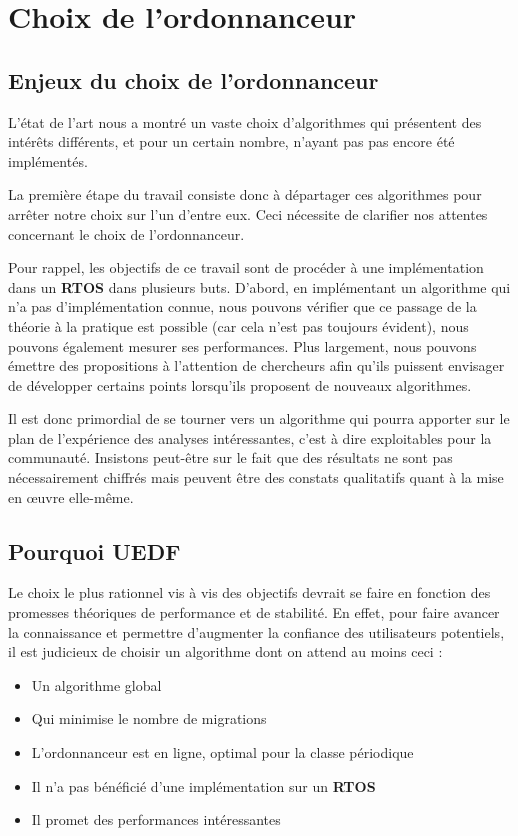 \section{Choix de l'ordonnanceur}

	\subsection{Enjeux du choix de l'ordonnanceur}

	L'état de l'art nous a montré un vaste choix d'algorithmes qui présentent 
	des intérêts différents, et pour un certain nombre, 
	n'ayant pas pas encore été implémentés. \newline
	
	La première étape du travail consiste donc à départager ces algorithmes pour arrêter notre choix sur l'un d'entre eux. Ceci nécessite de clarifier nos attentes concernant le choix de l'ordonnanceur.\newline
	
	Pour rappel, les objectifs de ce travail sont de procéder à une implémentation dans 
	un \textbf{RTOS} dans plusieurs buts. 
	D'abord, en implémentant un algorithme qui n'a pas d'implémentation connue, nous 
	pouvons vérifier que ce passage de la théorie à la pratique est possible (car cela n'est pas 
	toujours évident), nous pouvons également mesurer ses performances. 
	Plus largement, nous pouvons émettre des propositions à l'attention de chercheurs 
	afin qu'ils puissent envisager de développer certains points lorsqu'ils proposent de nouveaux algorithmes. \newline
	
	Il est donc primordial de se tourner vers un algorithme qui pourra apporter sur le plan de 
	l'expérience des analyses intéressantes, c'est à dire exploitables pour la communauté. 
	Insistons peut-être sur le fait que des résultats ne sont pas nécessairement chiffrés mais 
	peuvent être des constats qualitatifs quant à la mise en œuvre elle-même.\newline
	
	\subsection{Pourquoi UEDF}
	
	Le choix le plus rationnel vis à vis des objectifs devrait se faire en fonction des 
	promesses théoriques de performance et de stabilité. 
	En effet, pour faire avancer la connaissance et permettre d'augmenter la confiance des utilisateurs 
	potentiels, il est judicieux de choisir un algorithme dont on attend au moins ceci :
	\begin{itemize}
		\item Un algorithme global
		\item Qui minimise le nombre de migrations
		\item L'ordonnanceur est en ligne, optimal pour la classe périodique
		\item Il n'a pas bénéficié d'une implémentation sur un \textbf{RTOS}
		\item Il promet des performances intéressantes
	\end{itemize}
	
